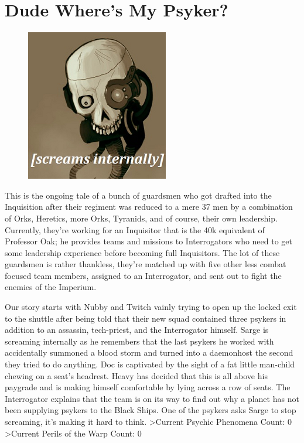 \chapter{Dude Where's My Psyker?}

\begin{figure}
	\begin{center}
		\includegraphics[width=\figwidth]{pics/3/5.png}
	\end{center}
\end{figure}
This is the ongoing tale of a bunch of guardsmen who got drafted into the Inquisition after their regiment was reduced to a mere 37 men by a combination of Orks, Heretics, more Orks, Tyranids, and of course, their own leadership. 
Currently, they’re working for an Inquisitor that is the 40k equivalent of Professor Oak; he provides teams and missions to Interrogators who need to get some leadership experience before becoming full Inquisitors. 
The lot of these guardsmen is rather thankless, they’re matched up with five other less combat focused team members, assigned to an Interrogator, and sent out to fight the enemies of the Imperium.

Our story starts with Nubby and Twitch vainly trying to open up the locked exit to the shuttle after being told that their new squad contained three psykers in addition to an assassin, tech-priest, and the Interrogator himself. 
Sarge is screaming internally as he remembers that the last psykers he worked with accidentally summoned a blood storm and turned into a daemonhost the second they tried to do anything. 
Doc is captivated by the sight of a fat little man-child chewing on a seat’s headrest. 
Heavy has decided that this is all above his paygrade and is making himself comfortable by lying across a row of seats. 
The Interrogator explains that the team is on its way to find out why a planet has not been supplying psykers to the Black Ships. 
One of the psykers asks Sarge to stop screaming, it’s making it hard to think.
>Current Psychic Phenomena Count: 0
>Current Perils of the Warp Count: 0 

